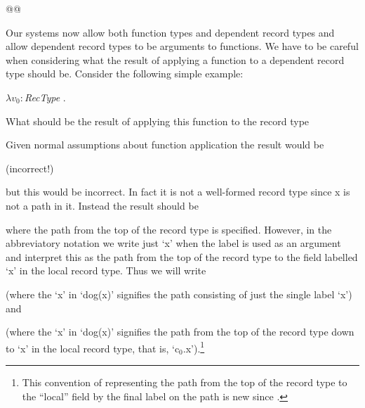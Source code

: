 @@

Our systems now allow both function types and dependent record types
and allow dependent record types to be arguments to functions.  We
have to be careful when considering what the result of applying a
function to a dependent record type should be.  Consider the following
simple example:
\begin{display}
$\lambda
v_0:$\textit{RecType} . 
\end{display}
What should be the result of applying this function to the record type
\begin{display}
\end{display}
Given normal assumptions about function application the result would
be
\begin{display}
 (incorrect!)
\end{display}
but this would be incorrect.  In fact it is not a well-formed record
type since x is not a path in it.  Instead the result should be 
\begin{display}
\end{display}
where the path from the top of the record type is specified.  However,
in the abbreviatory notation we write just `x' when the label is used
as an argument and interpret this as the path from the top of the
record type to the field labelled `x' in the local record type.  Thus
we will write
\begin{display}
\end{display}
(where the `x' in `dog(x)' signifies the path consisting of just the
single label `x') and
\begin{display}
\end{display}
(where the `x' in `dog(x)' signifies the path from the top of the
record type down to `x' in the local
record type, that is, `c$_0$.x').\footnote{This convention of
  representing the path from the top of the record type to the
  ``local'' field by the final label on the path is new since \cite{Cooper2012}.}

